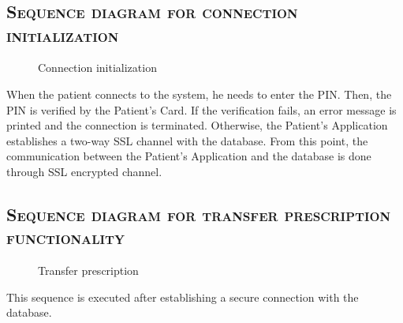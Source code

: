 \newpage

\chapter {}

\FloatBarrier
\section{\textsc{Sequence diagram for connection initialization}}

\begin{figure}[!h]
\caption{Connection initialization}	
\end{figure}
When the patient connects to the system, he needs to enter the PIN. 
Then, the PIN is verified by the Patient’s Card. 
If the verification fails, an error message is printed and the connection is terminated. 
Otherwise, the Patient’s Application establishes a two-way SSL channel with the database. 
From this point, the communication between the Patient’s Application and the database is done through SSL encrypted channel.

\FloatBarrier


\section{\textsc{Sequence diagram for transfer prescription functionality}}
\begin{figure}[!h]
\caption{Transfer prescription}
\end{figure}
This sequence is executed after establishing a secure connection with the database.\\

